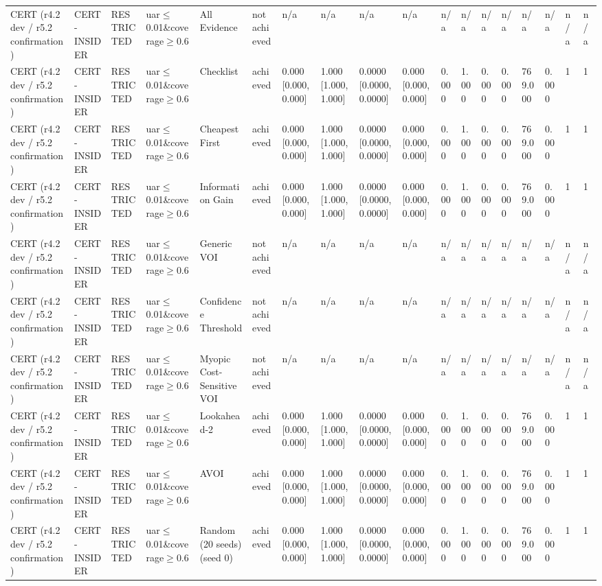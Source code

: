 \begin{table}[!ht]
{\begin{tabular}{llllllllllllllllll}
CERT (r4.2 dev / r5.2 confirmation) & CERT-INSIDER & RESTRICTED & uar$\le$0.01\&coverage$\ge$0.6 & All Evidence & not achieved & n/a & n/a & n/a & n/a & n/a & n/a & n/a & n/a & n/a & n/a & n/a & n/a \\
CERT (r4.2 dev / r5.2 confirmation) & CERT-INSIDER & RESTRICTED & uar$\le$0.01\&coverage$\ge$0.6 & Checklist & achieved & 0.000 [0.000, 0.000] & 1.000 [1.000, 1.000] & 0.0000 [0.0000, 0.0000] & 0.000 [0.000, 0.000] & 0.000 & 1.000 & 0.000 & 0.000 & 769.000 & 0.000 & 1 & 1 \\
CERT (r4.2 dev / r5.2 confirmation) & CERT-INSIDER & RESTRICTED & uar$\le$0.01\&coverage$\ge$0.6 & Cheapest First & achieved & 0.000 [0.000, 0.000] & 1.000 [1.000, 1.000] & 0.0000 [0.0000, 0.0000] & 0.000 [0.000, 0.000] & 0.000 & 1.000 & 0.000 & 0.000 & 769.000 & 0.000 & 1 & 1 \\
CERT (r4.2 dev / r5.2 confirmation) & CERT-INSIDER & RESTRICTED & uar$\le$0.01\&coverage$\ge$0.6 & Information Gain & achieved & 0.000 [0.000, 0.000] & 1.000 [1.000, 1.000] & 0.0000 [0.0000, 0.0000] & 0.000 [0.000, 0.000] & 0.000 & 1.000 & 0.000 & 0.000 & 769.000 & 0.000 & 1 & 1 \\
CERT (r4.2 dev / r5.2 confirmation) & CERT-INSIDER & RESTRICTED & uar$\le$0.01\&coverage$\ge$0.6 & Generic VOI & not achieved & n/a & n/a & n/a & n/a & n/a & n/a & n/a & n/a & n/a & n/a & n/a & n/a \\
CERT (r4.2 dev / r5.2 confirmation) & CERT-INSIDER & RESTRICTED & uar$\le$0.01\&coverage$\ge$0.6 & Confidence Threshold & not achieved & n/a & n/a & n/a & n/a & n/a & n/a & n/a & n/a & n/a & n/a & n/a & n/a \\
CERT (r4.2 dev / r5.2 confirmation) & CERT-INSIDER & RESTRICTED & uar$\le$0.01\&coverage$\ge$0.6 & Myopic Cost-Sensitive VOI & not achieved & n/a & n/a & n/a & n/a & n/a & n/a & n/a & n/a & n/a & n/a & n/a & n/a \\
CERT (r4.2 dev / r5.2 confirmation) & CERT-INSIDER & RESTRICTED & uar$\le$0.01\&coverage$\ge$0.6 & Lookahead-2 & achieved & 0.000 [0.000, 0.000] & 1.000 [1.000, 1.000] & 0.0000 [0.0000, 0.0000] & 0.000 [0.000, 0.000] & 0.000 & 1.000 & 0.000 & 0.000 & 769.000 & 0.000 & 1 & 1 \\
CERT (r4.2 dev / r5.2 confirmation) & CERT-INSIDER & RESTRICTED & uar$\le$0.01\&coverage$\ge$0.6 & AVOI & achieved & 0.000 [0.000, 0.000] & 1.000 [1.000, 1.000] & 0.0000 [0.0000, 0.0000] & 0.000 [0.000, 0.000] & 0.000 & 1.000 & 0.000 & 0.000 & 769.000 & 0.000 & 1 & 1 \\
CERT (r4.2 dev / r5.2 confirmation) & CERT-INSIDER & RESTRICTED & uar$\le$0.01\&coverage$\ge$0.6 & Random (20 seeds) (seed 0) & achieved & 0.000 [0.000, 0.000] & 1.000 [1.000, 1.000] & 0.0000 [0.0000, 0.0000] & 0.000 [0.000, 0.000] & 0.000 & 1.000 & 0.000 & 0.000 & 769.000 & 0.000 & 1 & 1 \\

\end{tabular}}
\end{table}
